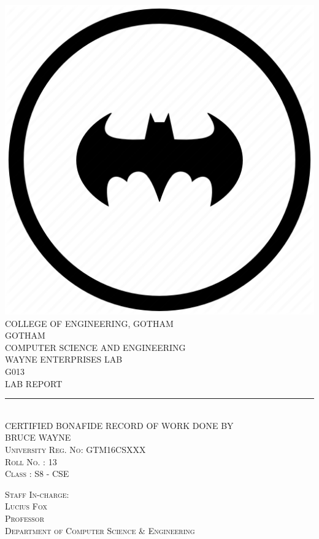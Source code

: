 \begin{titlepage}
	\centering
    \includegraphics[scale = 0.2]{logo.png}\\[1.0 cm]	%
    \textsc{\Large COLLEGE OF ENGINEERING, GOTHAM\\
    [0.5 cm]
    GOTHAM}\\ %
    [1.5 cm]
    \textsc{\lARGE COMPUTER SCIENCE AND ENGINEERING} \\
    [0.2 cm]
    \textsc{\lARGE WAYNE ENTERPRISES LAB}\\
    [0.7 cm]
	\textsc{\Large G013}\\
	[1.0 cm]	%
	\textsc{\Large LAB REPORT}\\
	[0.2 cm]
	\rule{\linewidth}{0.2 mm} \\
	[0.7 cm]
	\textsc{\lARGE CERTIFIED BONAFIDE RECORD OF WORK DONE BY}\\
	[0.3cm]
	\textsc{\lARGE BRUCE WAYNE}\\
	[0.2cm]
	\textsc{\lARGE University Reg. No:   GTM16CSXXX}\\
	[0.2cm]
	\textsc{\lARGE Roll No.          :   13}\\
	[0.2cm]
	\textsc{\lARGE Class             :  S8 - CSE}\\
	[0.2cm]

	\vspace{7mm} %
	
\begin{flushleft}
	
	\textsc{\lARGE Staff In-charge:}\\
	[0.2cm]
	\textsc{\lARGE Lucius Fox}\\
	[0.1cm]
	\textsc{\lARGE Professor}\\
	[0.1cm]
	\textsc{\lARGE Department of Computer Science \& Engineering}
\end{flushleft}

\end{titlepage}

